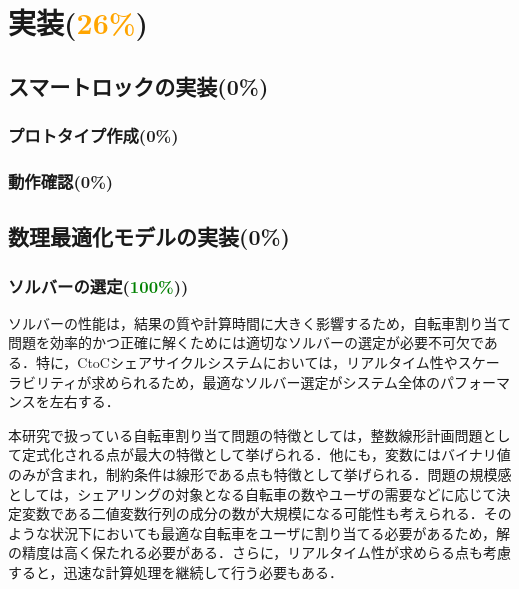 \section{実装(\textcolor{orange}{26\%})}
  \label{sec:実装}
    \par
  
  \subsection{スマートロックの実装(0\%)}
    \label{sec:スマートロックの実装}
      \par
  
      \subsubsection{プロトタイプ作成(0\%)}
        \label{sec:プロトタイプ作成}
          \par
          
      \subsubsection{動作確認(0\%)}
        \label{sec:動作確認}
          \par
          
  \subsection{数理最適化モデルの実装(0\%)}
    \label{sec:数理最適化モデルの実装}
      \par
      
      \subsubsection{ソルバーの選定(\textcolor{green}{100\%}))}
        \label{sec:ソルバーの選定}
          \par ソルバーの性能は，結果の質や計算時間に大きく影響するため，自転車割り当て問題を効率的かつ正確に解くためには適切なソルバーの選定が必要不可欠である．特に，CtoCシェアサイクルシステムにおいては，リアルタイム性やスケーラビリティが求められるため，最適なソルバー選定がシステム全体のパフォーマンスを左右する．
          
          \par 本研究で扱っている自転車割り当て問題の特徴としては，整数線形計画問題として定式化される点が最大の特徴として挙げられる．他にも，変数にはバイナリ値のみが含まれ，制約条件は線形である点も特徴として挙げられる．問題の規模感としては，シェアリングの対象となる自転車の数やユーザの需要などに応じて決定変数である二値変数行列の成分の数が大規模になる可能性も考えられる．そのような状況下においても最適な自転車をユーザに割り当てる必要があるため，解の精度は高く保たれる必要がある．さらに，リアルタイム性が求めらる点も考慮すると，迅速な計算処理を継続して行う必要もある．
          
